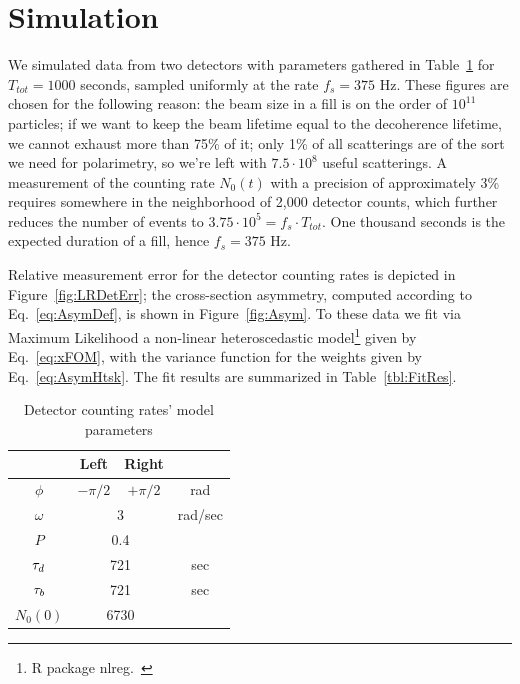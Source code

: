 \section{Simulation}
\newcommand{\vp}[2]{{#1}\cdot 10^{#2}}
We simulated data from two detectors with parameters gathered in Table~\ref{tbl:DetCntRtParam} for $T_{tot}=1000$ seconds, sampled uniformly at the rate $f_s = 375$ Hz. These figures are chosen for the following reason: the beam size in a fill is on the order of $10^{11}$ particles; if we want to keep the beam lifetime equal to the decoherence lifetime, we cannot exhaust more than 75\% of it; only 1\% of all scatterings are of the sort we need for polarimetry, so we're left with $\vp{7.5}{8}$ useful scatterings. A measurement of the counting rate $N_0(t)$ with a precision of approximately 3\% requires somewhere in the neighborhood of 2,000 detector counts, which further reduces the number of events to $\vp{3.75}{5}= f_s\cdot T_{tot}$. One thousand seconds is the expected duration of a fill, hence $f_s = 375$ Hz. 

Relative measurement error for the detector counting rates is depicted in Figure~\ref{fig:LRDetErr}; the cross-section asymmetry, computed according to Eq.~\eqref{eq:AsymDef}, is shown in Figure~\ref{fig:Asym}.
To these data we fit via Maximum Likelihood a non-linear heteroscedastic model\footnote{R package nlreg.~\cite{NLREG}} given by Eq.~\eqref{eq:xFOM}, with the variance function for the weights given by Eq.~\eqref{eq:AsymHtsk}. The fit results are summarized in Table~\ref{tbl:FitRes}.
\begin{table}[h]
  \centering
  \caption{Detector counting rates' model parameters\label{tbl:DetCntRtParam}}
  \begin{tabular}{cccc}
    \hline
    &   Left   &     Right     &  \\ \hline
    $\phi$  & $-\pi/2$ &   $+\pi/2$    &   rad   \\
    $\omega$ &  \multicolumn{2}{c}{3}   & rad/sec \\
    $P$    & \multicolumn{2}{c}{0.4}  &  \\
    $\tau_d$  & \multicolumn{2}{c}{721}  &   sec   \\
    $\tau_b$  & \multicolumn{2}{c}{721}  &   sec   \\
    $N_0(0)$ & \multicolumn{2}{c}{6730} &  \\ \hline
  \end{tabular}
\end{table}

